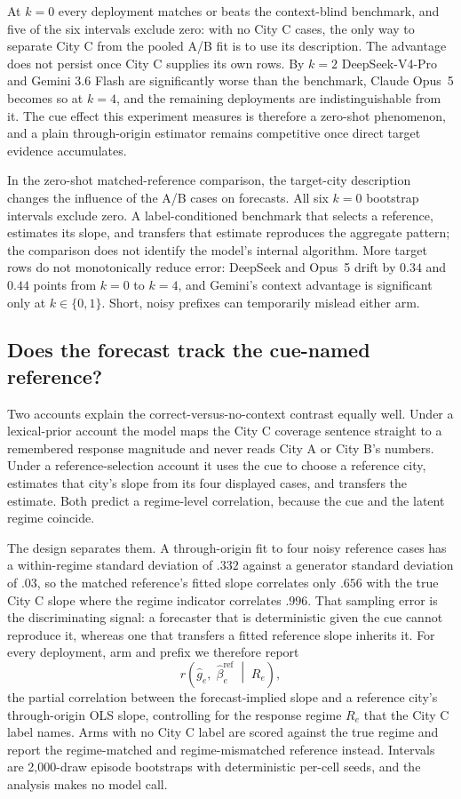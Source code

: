 At $k=0$ every deployment matches or beats the context-blind benchmark, and five
of the six intervals exclude zero: with no City C cases, the only way to separate
City C from the pooled A/B fit is to use its description. The advantage does not
persist once City C supplies its own rows. By $k=2$ DeepSeek-V4-Pro and Gemini 3.6
Flash are significantly worse than the benchmark, Claude Opus~5 becomes so at
$k=4$, and the remaining deployments are indistinguishable from it. The cue effect
this experiment measures is therefore a zero-shot phenomenon, and a plain
through-origin estimator remains competitive once direct target evidence
accumulates.

In the zero-shot matched-reference comparison, the target-city description changes
the influence of the A/B cases on forecasts. All six $k=0$ bootstrap intervals
exclude zero. A label-conditioned benchmark that selects a reference, estimates
its slope, and transfers that estimate reproduces the aggregate pattern; the
comparison does not identify the model's internal algorithm.
More target rows do not monotonically reduce error: DeepSeek and Opus~5 drift by
$0.34$ and $0.44$ points from $k=0$ to $k=4$, and Gemini's context advantage is
significant only at $k\in\{0,1\}$. Short, noisy prefixes can temporarily mislead
either arm.

\subsection{Does the forecast track the cue-named reference?}
\label{app:coin-city-reference-selection}

Two accounts explain the correct-versus-no-context contrast equally well. Under a
lexical-prior account the model maps the City C coverage sentence straight to a
remembered response magnitude and never reads City A or City B's numbers. Under a
reference-selection account it uses the cue to choose a reference city, estimates
that city's slope from its four displayed cases, and transfers the estimate. Both
predict a regime-level correlation, because the cue and the latent regime coincide.

The design separates them. A through-origin fit to four noisy reference cases has
a within-regime standard deviation of $.332$ against a generator standard
deviation of $.03$, so the matched reference's fitted slope correlates only $.656$
with the true City C slope where the regime indicator correlates $.996$. That
sampling error is the discriminating signal: a forecaster that is deterministic
given the cue cannot reproduce it, whereas one that transfers a fitted reference
slope inherits it. For every deployment, arm and prefix we therefore report
\[
  r\!\left(\widehat g_e,\;\widehat\beta^{\mathrm{ref}}_e \;\middle|\; R_e\right),
\]
the partial correlation between the forecast-implied slope and a reference city's
through-origin OLS slope, controlling for the response regime $R_e$ that the City
C label names. Arms with no City C label are scored against the true regime and
report the regime-matched and regime-mismatched reference instead. Intervals are
2,000-draw episode bootstraps with deterministic per-cell seeds, and the analysis
makes no model call.

